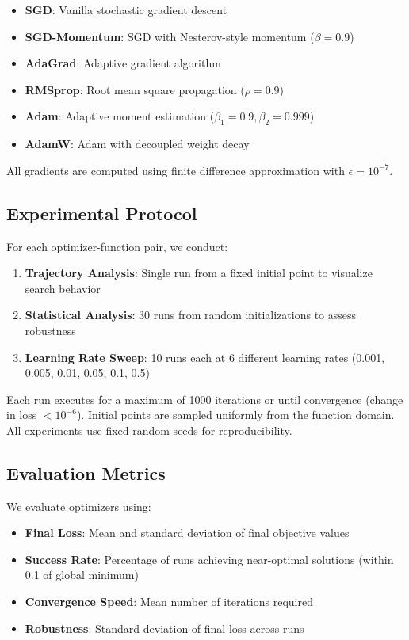 \documentclass[12pt,a4paper]{article}
\begin{document}
\begin{itemize}
    \item \textbf{SGD}: Vanilla stochastic gradient descent
    \item \textbf{SGD-Momentum}: SGD with Nesterov-style momentum ($\beta=0.9$)
    \item \textbf{AdaGrad}: Adaptive gradient algorithm
    \item \textbf{RMSprop}: Root mean square propagation ($\rho=0.9$)
    \item \textbf{Adam}: Adaptive moment estimation ($\beta_1=0.9, \beta_2=0.999$)
    \item \textbf{AdamW}: Adam with decoupled weight decay
\end{itemize}

All gradients are computed using finite difference approximation with $\epsilon=10^{-7}$.

\subsection{Experimental Protocol}

For each optimizer-function pair, we conduct:

\begin{enumerate}
    \item \textbf{Trajectory Analysis}: Single run from a fixed initial point to visualize search behavior
    \item \textbf{Statistical Analysis}: 30 runs from random initializations to assess robustness
    \item \textbf{Learning Rate Sweep}: 10 runs each at 6 different learning rates (0.001, 0.005, 0.01, 0.05, 0.1, 0.5)
\end{enumerate}

Each run executes for a maximum of 1000 iterations or until convergence (change in loss $< 10^{-6}$). Initial points are sampled uniformly from the function domain. All experiments use fixed random seeds for reproducibility.

\subsection{Evaluation Metrics}

We evaluate optimizers using:

\begin{itemize}
    \item \textbf{Final Loss}: Mean and standard deviation of final objective values
    \item \textbf{Success Rate}: Percentage of runs achieving near-optimal solutions (within 0.1 of global minimum)
    \item \textbf{Convergence Speed}: Mean number of iterations required
    \item \textbf{Robustness}: Standard deviation of final loss across runs
\end{itemize}
\end{document}
